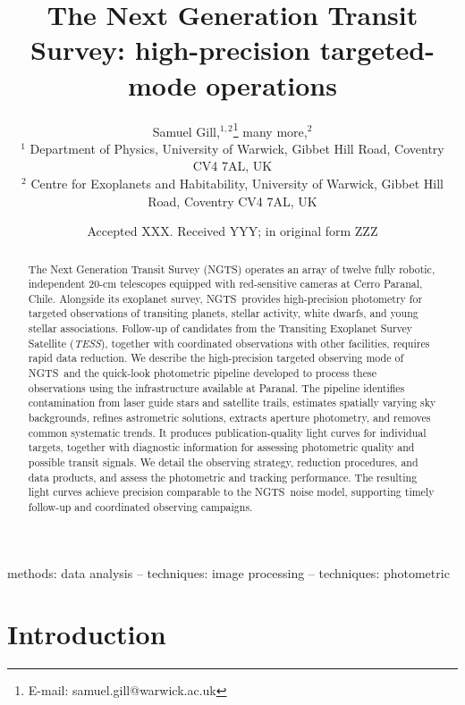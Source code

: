 \documentclass[fleqn,usenatbib]{mnras}
\title[NGTS targeted-mode operations and pipeline]{The Next Generation Transit Survey: high-precision targeted-mode operations}
\author[S. Gill et al.]{
Samuel Gill,$^{1,2}$\thanks{E-mail: samuel.gill@warwick.ac.uk}
many more,$^{2}$
\\
$^{1}$ Department of Physics, University of Warwick, Gibbet Hill Road, Coventry CV4 7AL, UK\\
$^{2}$ Centre for Exoplanets and Habitability, University of Warwick, Gibbet Hill Road, Coventry CV4 7AL, UK
}
\date{Accepted XXX. Received YYY; in original form ZZZ}
\newcommand{\ngts}{{NGTS}}
\newcommand{\tess}{{\it TESS}}
\begin{document}
\label{firstpage}
\pagerange{\pageref{firstpage}--\pageref{lastpage}}
\maketitle

\begin{abstract}
The Next Generation Transit Survey (\ngts) operates an array of twelve fully robotic, independent 20-cm telescopes equipped with red-sensitive cameras at Cerro Paranal, Chile. Alongside its exoplanet survey, \ngts\ provides high-precision photometry for targeted observations of transiting planets, stellar activity, white dwarfs, and young stellar associations. Follow-up of candidates from the Transiting Exoplanet Survey Satellite (\tess), together with coordinated observations with other facilities, requires rapid data reduction. We describe the high-precision targeted observing mode of \ngts\ and the quick-look photometric pipeline developed to process these observations using the infrastructure available at Paranal. The pipeline identifies contamination from laser guide stars and satellite trails, estimates spatially varying sky backgrounds, refines astrometric solutions, extracts aperture photometry, and removes common systematic trends. It produces publication-quality light curves for individual targets, together with diagnostic information for assessing photometric quality and possible transit signals. We detail the observing strategy, reduction procedures, and data products, and assess the photometric and tracking performance. The resulting light curves achieve precision comparable to the \ngts\ noise model, supporting timely follow-up and coordinated observing campaigns.
\end{abstract}

\begin{keywords}
methods: data analysis -- techniques: image processing -- techniques: photometric
\end{keywords}



\section{Introduction}
\end{document}
